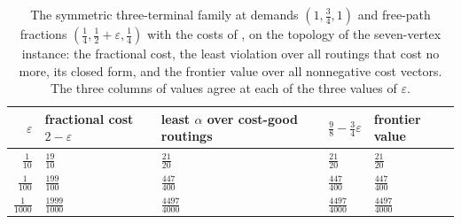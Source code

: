 \begin{table}[t]
\centering\small
\begin{tabular}{@{}rllll@{}}
\toprule
$\varepsilon$ & fractional cost $2-\varepsilon$ & least $\alpha$ over cost-good routings & $\tfrac98-\tfrac34\varepsilon$ & frontier value\\
\midrule
$\tfrac{1}{10}$ & $\tfrac{19}{10}$ & $\tfrac{21}{20}$ & $\tfrac{21}{20}$ & $\tfrac{21}{20}$\\
$\tfrac{1}{100}$ & $\tfrac{199}{100}$ & $\tfrac{447}{400}$ & $\tfrac{447}{400}$ & $\tfrac{447}{400}$\\
$\tfrac{1}{1000}$ & $\tfrac{1999}{1000}$ & $\tfrac{4497}{4000}$ & $\tfrac{4497}{4000}$ & $\tfrac{4497}{4000}$\\
\bottomrule
\end{tabular}
\caption{The symmetric three-terminal family at demands $(1,\tfrac34,1)$ and free-path fractions $(\tfrac14,\tfrac12+\varepsilon,\tfrac14)$ with the costs of \cite{Muf26}, on the topology of the seven-vertex instance: the fractional cost, the least violation over all routings that cost no more, its closed form, and the frontier value over all nonnegative cost vectors. The three columns of values agree at each of the three values of $\varepsilon$.}
\label{tab:muffatti}
\end{table}
